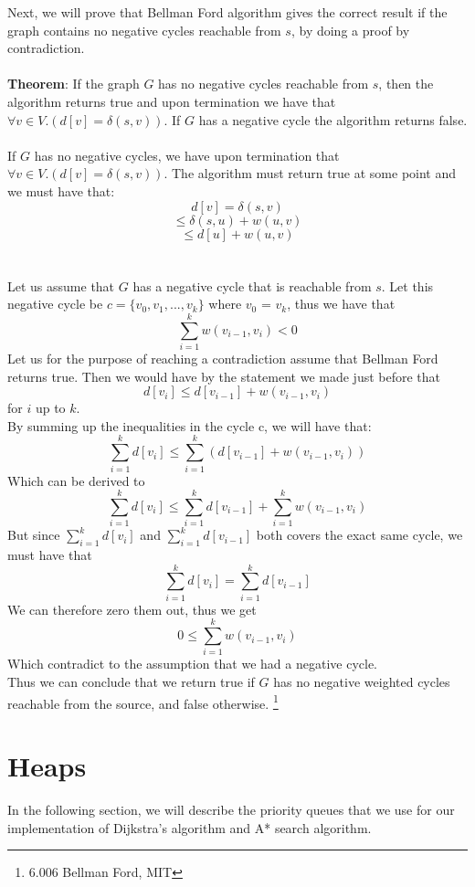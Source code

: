 \documentclass[11pt]{article}
\begin{document}
\noindent Next, we will prove that Bellman Ford algorithm gives the correct result if the graph contains no negative cycles reachable from $s$, by doing a proof by contradiction.\\\\
\textbf{Theorem}: If the graph $G$ has no negative cycles reachable from $s$, then the algorithm returns true and upon termination we have that $\forall v \in V. (d[v] = \delta(s,v))$. If $G$ has a negative cycle the algorithm returns false.\\\\
If $G$ has no negative cycles, we have upon termination that $\forall v \in V. (d[v] = \delta(s,v))$. The algorithm must return true at some point and we must have that: $$d[v] = \delta(s,v)$$$$\leq \delta(s,u) + w(u,v)$$$$\leq d[u] + w(u,v)$$\\\\
Let us assume that $G$ has a negative cycle that is reachable from $s$. Let this negative cycle be $c = \{v_0, v_1,...,v_k\}$ where $v_0$ = $v_k$, thus we have that $$\displaystyle\sum_{i=1}^{k} w(v_{i-1}, v_i) < 0$$
Let us for the purpose of reaching a contradiction assume that Bellman Ford returns true. Then we would have by the statement we made just before that $$d[v_i] \leq d[v_{i-1}] + w(v_{i-1},v_{i})$$ for $i$ up to $k$.\\
By summing up the inequalities in the cycle c, we will have that: $$\displaystyle\sum_{i=1}^{k} d[v_i] \leq \displaystyle\sum_{i=1}^{k} (d[v_{i-1}] + w(v_{i-1}, v_i))$$
Which can be derived to
$$\displaystyle\sum_{i=1}^{k} d[v_i] \leq \displaystyle\sum_{i=1}^{k} d[v_{i-1}] + \displaystyle\sum_{i=1}^{k} {w(v_{i-1}, v_i)}$$
But since $\sum_{i=1}^{k} d[v_i]$ and $\sum_{i=1}^{k} d[v_{i-1}]$ both covers the exact same cycle, we must have that 
$$\displaystyle\sum_{i=1}^{k} d[v_i] = \displaystyle\sum_{i=1}^{k} d[v_{i-1}]$$
We can therefore zero them out, thus we get
$$0 \leq \displaystyle\sum_{i=1}^{k} w(v_{i-1}, v_i)$$
Which contradict to the assumption that we had a negative cycle.\\
Thus we can conclude that we return true if $G$ has no negative weighted cycles reachable from the source, and false otherwise.
\footnote{6.006 Bellman Ford, MIT}



\newpage
\section{Heaps}
In the following section, we will describe the priority queues that we use for our implementation of Dijkstra's algorithm and A* search algorithm.\\
\end{document}
